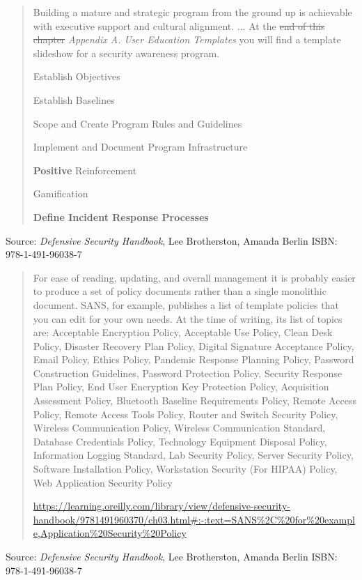 \documentclass[Screen16to9,17pt]{foils}
\begin{document}

\begin{quote}
Building a mature and strategic program from the ground up is achievable with executive support and cultural alignment. ...  At the \sout{end of this chapter} \emph{Appendix A. User Education Templates} you will find a template slideshow for a security awareness program.

\begin{list2}
\item Establish Objectives
\item Establish Baselines
\item Scope and Create Program Rules and Guidelines
\item Implement and Document Program Infrastructure
\item {\bf Positive} Reinforcement
\item Gamification
\item {\bf Define Incident Response Processes}
\end{list2}
\end{quote}
Source: \emph{Defensive Security Handbook}, Lee Brotherston, Amanda Berlin ISBN: 978-1-491-96038-7







\begin{quote}
For ease of reading, updating, and overall management it is probably easier to produce a set of policy documents rather than a single monolithic document.
SANS, for example, publishes a list of template policies that you can edit for your own needs. At the time of writing, its list of topics are: {\small
Acceptable Encryption Policy,
Acceptable Use Policy,
Clean Desk Policy,
Disaster Recovery Plan Policy,
Digital Signature Acceptance Policy,
Email Policy,
Ethics Policy,
Pandemic Response Planning Policy,
Password Construction Guidelines,
Password Protection Policy,
Security Response Plan Policy,
End User Encryption Key Protection Policy,
Acquisition Assessment Policy,
Bluetooth Baseline Requirements Policy,
Remote Access Policy,
Remote Access Tools Policy,
Router and Switch Security Policy,
Wireless Communication Policy,
Wireless Communication Standard,
Database Credentials Policy,
Technology Equipment Disposal Policy,
Information Logging Standard,
Lab Security Policy,
Server Security Policy,
Software Installation Policy,
Workstation Security (For HIPAA) Policy,
Web Application Security Policy}

{\scriptsize\url{https://learning.oreilly.com/library/view/defensive-security-handbook/9781491960370/ch03.html#:-:text=SANS%2C%20for%20example,Application%20Security%20Policy}}
\end{quote}
Source: \emph{Defensive Security Handbook}, Lee Brotherston, Amanda Berlin ISBN: 978-1-491-96038-7
\end{document}
